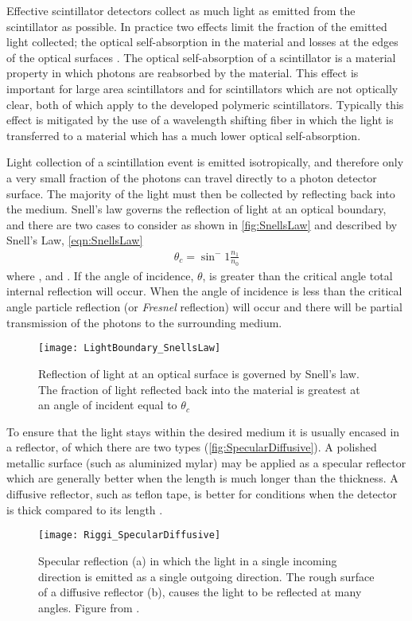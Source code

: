 Effective scintillator detectors collect as much light as emitted from the scintillator as possible.
In practice two effects limit the fraction of the emitted light collected; the optical self-absorption in the material and losses at the edges of the optical surfaces \cite{knoll_radiation_2009}.
The optical self-absorption of a scintillator is a material property in which photons are reabsorbed by the material.
This effect is important for large area scintillators and for scintillators which are not optically  clear, both of which apply to the developed polymeric scintillators.
Typically this effect is mitigated by the use of a wavelength shifting fiber in which the light is transferred to a material which has a much lower optical self-absorption.

Light collection of a scintillation event is emitted isotropically, and therefore only a very small fraction of the photons can travel directly to a photon detector surface.
The majority of the light must then be collected by reflecting back into the medium.
Snell's law governs the reflection of light at an optical boundary, and there are two cases to consider as shown in \autoref{fig:SnellsLaw} and described by Snell's Law, \eqref{eqn:SnellsLaw}
\begin{align}
	\theta_c = \sin^-1 \frac{n_1}{n_0}
	\label{eqn:SnellsLaw}
\end{align}
where ,  and .
If the angle of incidence, $\theta$, is greater than the critical angle total internal reflection will occur.
When the angle of incidence is less than the critical angle particle reflection (or \textit{Fresnel} reflection) will occur and there will be partial transmission of the photons to the surrounding medium.
\begin{figure}
	\centering
	\texttt{[image: LightBoundary\_SnellsLaw]}
	\caption[Light Reflection at a Boundary]{Reflection of light at an optical surface is governed by Snell's law.  The fraction of light reflected back into the material is greatest at an angle of incident equal to $\theta_c$}
	\label{fig:SnellsLaw}
\end{figure}
To ensure that the light stays within the desired medium it is usually encased in a reflector, of which there are two types (\autoref{fig:SpecularDiffusive}).
A polished metallic surface (such as aluminized mylar) may be applied as a specular reflector which are generally better when the length is much longer than the thickness\cite{SaintGobain_DAM_2012}.
A diffusive reflector, such as teflon tape, is better for conditions when the detector is thick compared to its length \cite{knoll_radiation_2009}.
\begin{figure}
	\centering
	\texttt{[image: Riggi\_SpecularDiffusive]}
	\caption[Specular and Diffusive Reflection]{Specular reflection (a) in which the light in a single incoming direction is emitted as a single outgoing direction. The rough surface of a diffusive reflector (b), causes the light to be reflected at many angles. Figure from \cite{riggi_introducing_2011}.}
	\label{fig:SpecularDiffusive} 
\end{figure}

